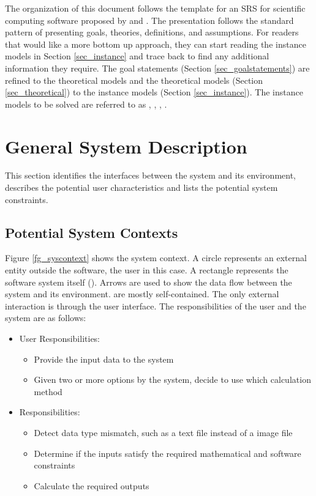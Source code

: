 \documentclass[12pt]{article}
\begin{document}
The organization of this document follows the template for an SRS for
scientific computing software proposed by \cite{Parnas1972} and
\cite{ParnasAndClements1986}. The presentation follows the standard pattern of
presenting goals, theories, definitions, and assumptions. For readers that
would like a more bottom up approach, they can start reading the instance
models in Section \ref{sec_instance} and trace back to find any additional
information they require.
The goal statements (Section \ref{sec_goalstatements}) are refined to the
theoretical models and the theoretical models (Section \ref{sec_theoretical})
to the instance models (Section \ref{sec_instance}). The instance models to be
solved are referred to as , ,
, .

\section{General System Description}

This section identifies the interfaces between the system and its environment,
describes the potential user characteristics and lists the potential system
constraints.

\subsection{Potential System Contexts}

Figure \ref{fg_syscontext} shows the system context. A circle represents an
external entity outside the software, the user in this case. A rectangle
represents the software system itself (\famname).
Arrows are used to show the data flow between the system and its environment.
\progname{} are mostly self-contained. The only external interaction is through
the user interface. The responsibilities of the user and the system are as
follows:

\begin{itemize}
\item User Responsibilities:
\begin{itemize}
\item Provide the input data to the system
\item Given two or more options by the system, decide to use which calculation
method
\end{itemize}
\item \progname{} Responsibilities:
\begin{itemize}
\item Detect data type mismatch, such as a text file instead of a image file
\item Determine if the inputs satisfy the required mathematical and software
constraints
\item Calculate the required outputs
\end{itemize}
\end{itemize}
\end{document}
